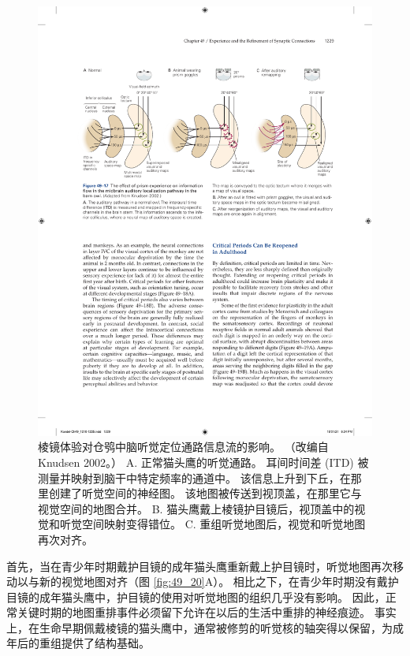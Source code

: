 \begin{figure}[htbp]
	\centering
	\includegraphics[width=0.95\linewidth]{chap49/fig_49_17}
	\caption{棱镜体验对仓鸮中脑听觉定位通路信息流的影响。 （改编自 Knudsen 2002。） A. 正常猫头鹰的听觉通路。 耳间时间差 (ITD) 被测量并映射到脑干中特定频率的通道中。 该信息上升到下丘，在那里创建了听觉空间的神经图。 该地图被传送到视顶盖，在那里它与视觉空间的地图合并。 B. 猫头鹰戴上棱镜护目镜后，视顶盖中的视觉和听觉空间映射变得错位。 C. 重组听觉地图后，视觉和听觉地图再次对齐。}
	\label{fig:49_17}
\end{figure}

首先，当在青少年时期戴护目镜的成年猫头鹰重新戴上护目镜时，听觉地图再次移动以与新的视觉地图对齐（图 \ref{fig:49_20}A）。 相比之下，在青少年时期没有戴护目镜的成年猫头鹰中，护目镜的使用对听觉地图的组织几乎没有影响。 因此，正常关键时期的地图重排事件必须留下允许在以后的生活中重排的神经痕迹。 事实上，在生命早期佩戴棱镜的猫头鹰中，通常被修剪的听觉核的轴突得以保留，为成年后的重组提供了结构基础。

